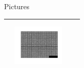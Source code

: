\documentclass{beamer}
\begin{document}
\begin{frame}{Pictures}
\begin{table}[h!]
\begin{tabular}{ | c | m{2.5cm} | m{2.5cm} | m{2.5cm}| }
\begin{minipage}{.3\textwidth}
\end{minipage}
& 
\begin{minipage}{.3\textwidth}
\includegraphics[width=25mm, height=25mm]{fig6}
\end{minipage}
\\ \hline
\end{tabular}
\end{table}
\end{frame}
\end{document}
